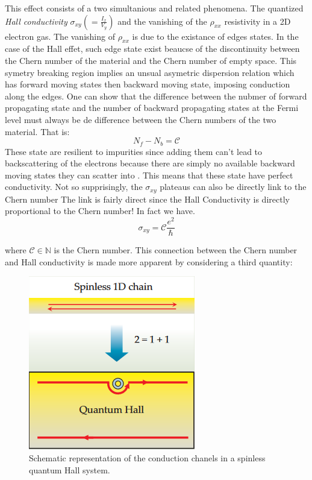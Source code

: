 This effect consists of a two simultanious and related phenomena. The quantized \textit{Hall conductivity} $\sigma_{xy}(=\frac{I_x}{V_y})$ and the vanishing of the $\rho_{xx}$ resistivity in a 2D electron gas. The vanishing of $\rho_{xx}$ is due to the existance of edges states.%
In the case of the Hall effet, such edge state exist beaucse of the discontinuity between the Chern number of the material and the Chern number of empty space. This symetry breaking region implies an unsual asymetric dispersion relation which has forward moving states then backward moving state, imposing conduction along the edges. One can show that the difference between the nubmer of forward  propagating state and the number of backward propagating states at the Fermi level must always be de difference between the Chern numbers of the two material\cite{kane_topological_2013}. That is: $$N_f -N_b = \mathcal{C}$$ These state are resilient to impurities since adding them can't lead to backscattering of the electrons because there are simply no available backward moving states they can scatter into \cite{qi_quantum_2010}. This means that these state have perfect conductivity. Not so supprisingly, the $\sigma_{xy}$ plateaus can also be directly link to the Chern number  The link is fairly direct since the Hall Conductivity is directly proportional to the Chern number! In fact we have.
\begin{equation}
\sigma_{xy} = \mathcal{C}\frac{e^2}{\hbar}
\end{equation}

where $\mathcal{C} \in \mathbb{N}$ is the Chern number. This connection between the Chern number and Hall conductivity is made more apparent by considering a third quantity: 

\begin{figure}[h!]
    \includegraphics[scale = 0.7]{sections/visuel/spinless.png}
    \caption{Schematic representation of the conduction chanels in a spinless quantum Hall system.\cite{qi_quantum_2010}}
    \label{spinless}
\end{figure}




